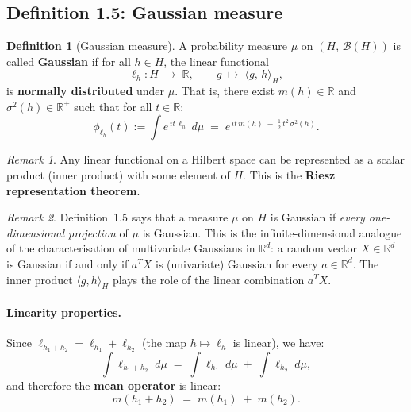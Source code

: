 \documentclass[11pt]{article}
\theoremstyle{definition}
\newtheorem{definition}{Definition}
\theoremstyle{remark}
\newtheorem{remark}{Remark}
\begin{document}
\subsection*{Definition 1.5: Gaussian measure}

\begin{definition}[Gaussian measure]
A probability measure $\mu$ on $(H,\,\mathcal{B}(H))$ is called
\textbf{Gaussian} if for all $h \in H$, the linear functional
\[
    \ell_h \colon H \;\longrightarrow\; \mathbb{R},
    \qquad
    g \;\longmapsto\; \langle g,\, h \rangle_H,
\]
is \textbf{normally distributed} under $\mu$. That is, there exist $m(h) \in \mathbb{R}$ and
$\sigma^2(h) \in \mathbb{R}^+$ such that for all $t \in \mathbb{R}$:
\[
    \phi_{\ell_h}(t) := \int e^{\,it\,\ell_h}\;d\mu
    \;=\;
    e^{\,it\,m(h) \;-\; \frac{1}{2}\,t^2\,\sigma^2(h)}.
\]
\end{definition}

\begin{remark}
Any linear functional on a Hilbert space can be represented as a
scalar product (inner product) with some element of $H$.
This is the \textbf{Riesz representation theorem}.
\end{remark}

\begin{remark}
Definition~1.5 says that a measure $\mu$ on $H$ is Gaussian if
\emph{every one-dimensional projection} of $\mu$ is Gaussian.
This is the infinite-dimensional analogue of the characterisation
of multivariate Gaussians in $\mathbb{R}^d$: a random vector
$X \in \mathbb{R}^d$ is Gaussian if and only if $a^T X$ is
(univariate) Gaussian for every $a \in \mathbb{R}^d$.
The inner product $\langle g, h\rangle_H$ plays the role of the
linear combination $a^T X$.
\end{remark}





\paragraph{Linearity properties.}

Since $\ell_{h_1 + h_2} = \ell_{h_1} + \ell_{h_2}$
(the map $h \mapsto \ell_h$ is linear), we have:
\[
    \int \ell_{h_1 + h_2}\;d\mu
    \;=\;
    \int \ell_{h_1}\;d\mu
    \;+\;
    \int \ell_{h_2}\;d\mu,
\]
and therefore the \textbf{mean operator} is linear:
\[
    m(h_1 + h_2) \;=\; m(h_1) \;+\; m(h_2).
\]
\end{document}
